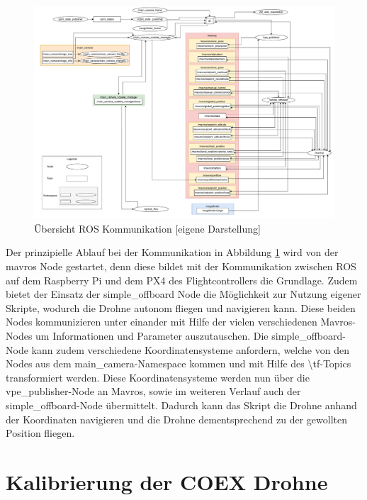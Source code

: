     \begin{landscape}
        \begin{figure}
            \includegraphics[width=\paperwidth,keepaspectratio]{images/graph_ros.pdf}
            \caption[Übersicht ROS Kommunikation]{\label{img ros_communication} Übersicht ROS Kommunikation [eigene Darstellung]}
        \end{figure}
    \end{landscape}


Der prinzipielle Ablauf bei der Kommunikation in Abbildung \ref{img ros_communication} wird von der mavros Node gestartet, denn diese bildet mit der Kommunikation zwischen ROS auf dem Raspberry Pi und dem PX4 des Flightcontrollers die Grundlage. Zudem bietet der Einsatz der simple\_offboard Node die Möglichkeit zur Nutzung eigener Skripte, wodurch die Drohne autonom fliegen und navigieren kann. Diese beiden Nodes kommunizieren unter einander mit Hilfe der vielen verschiedenen Mavros-Nodes um Informationen und Parameter auszutauschen. Die simple\_offboard-Node kann zudem verschiedene Koordinatensysteme anfordern, welche von den Nodes aus dem main\_camera-Namespace kommen und mit Hilfe des \textbackslash tf-Topics transformiert werden. Diese Koordinatensysteme werden nun über die vpe\_publisher-Node an Mavros, sowie im weiteren Verlauf auch der simple\_offboard-Node übermittelt. Dadurch kann das Skript die Drohne anhand der Koordinaten navigieren und die Drohne dementsprechend zu der gewollten Position fliegen.
 

\section{Kalibrierung der COEX Drohne} \label{kalibrierung_coex__drohne:subsection}
